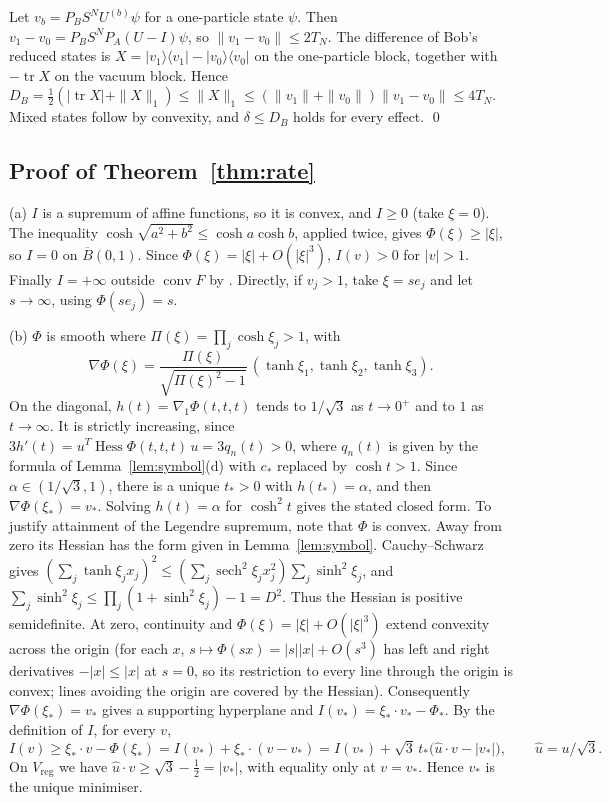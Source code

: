 \documentclass[11pt]{amsart}
\theoremstyle{definition}
\theoremstyle{remark}
\newcommand{\tr}{\operatorname{tr}}
\newcommand{\Hess}{\operatorname{Hess}}
\newcommand{\uhat}{\hat u}
\begin{document}
Let $v_b=P_BS^NU^{(b)}\psi$ for a one-particle state $\psi$.  Then
$v_1-v_0=P_BS^NP_A(U-I)\psi$, so $\|v_1-v_0\|\le2T_N$.  The difference of
Bob's reduced states is $X=|v_1\rangle\langle v_1|-|v_0\rangle\langle v_0|$ on
the one-particle block, together with $-\tr X$ on the vacuum block.  Hence
$D_B=\frac12(|\tr X|+\|X\|_1)\le\|X\|_1\le(\|v_1\|+\|v_0\|)\|v_1-v_0\|\le4T_N$.
Mixed states follow by convexity, and $\delta\le D_B$ holds for every effect.
\qed

\subsection{Proof of Theorem~\ref{thm:rate}}
(a) $I$ is a supremum of affine functions, so it is convex, and $I\ge0$
(take $\xi=0$).  The inequality
$\cosh\sqrt{a^2+b^2}\le\cosh a\cosh b$, applied twice, gives
$\Phi(\xi)\ge|\xi|$, so $I=0$ on $\overline B(0,1)$.  Since
$\Phi(\xi)=|\xi|+O(|\xi|^3)$, $I(v)>0$ for $|v|>1$.  Finally $I=+\infty$ outside
$\operatorname{conv}F$ by \cite[Lemma~4.1]{CJWW}.  Directly, if
$v_j>1$, take $\xi=se_j$ and let $s\to\infty$, using $\Phi(se_j)=s$.

(b) $\Phi$ is smooth where $\Pi(\xi)=\prod_j\cosh\xi_j>1$, with
\[
\nabla\Phi(\xi)=\frac{\Pi(\xi)}{\sqrt{\Pi(\xi)^2-1}}\,(\tanh\xi_1,\tanh\xi_2,\tanh\xi_3).
\]
On the diagonal, $h(t)=\nabla_1\Phi(t,t,t)$ tends to $1/\sqrt3$ as
$t\to0^+$ and to $1$ as $t\to\infty$.  It is strictly increasing, since
$3h'(t)=u^T\Hess\Phi(t,t,t)\,u=3q_n(t)>0$, where $q_n(t)$ is given by the
formula of Lemma~\ref{lem:symbol}(d) with $c_*$ replaced by $\cosh t>1$.  Since
$\alpha\in(1/\sqrt3,1)$, there is a unique $t_*>0$ with $h(t_*)=\alpha$, and
then $\nabla\Phi(\xi_*)=v_*$.  Solving $h(t)=\alpha$ for $\cosh^2t$ gives the
stated closed form. To justify attainment of the Legendre supremum, note
that $\Phi$ is convex. Away from zero its Hessian has the form given in
Lemma~\ref{lem:symbol}. Cauchy--Schwarz gives
$(\sum_j\tanh\xi_j x_j)^2\le
(\sum_j\operatorname{sech}^2\xi_j x_j^2)\sum_j\sinh^2\xi_j$,
and $\sum_j\sinh^2\xi_j\le\prod_j(1+\sinh^2\xi_j)-1=D^2$.
Thus the Hessian is positive semidefinite. At zero, continuity and
$\Phi(\xi)=|\xi|+O(|\xi|^3)$ extend convexity across the origin
(for each $x$, $s\mapsto\Phi(sx)=|s||x|+O(s^3)$ has left and right
derivatives $-|x|\le|x|$ at $s=0$, so its restriction to every line
through the origin is convex; lines avoiding the origin are covered by the
Hessian).
Consequently $\nabla\Phi(\xi_*)=v_*$ gives a supporting hyperplane and
$I(v_*)=\xi_*\cdot v_*-\Phi_*$. By the definition of $I$, for every $v$,
\[
I(v)\ge\xi_*\cdot v-\Phi(\xi_*)=I(v_*)+\xi_*\cdot(v-v_*)
=I(v_*)+\sqrt3\,t_*\bigl(\uhat\cdot v-|v_*|\bigr),
\qquad \uhat=u/\sqrt3 .
\]
On $V_{\mathrm{reg}}$ we have $\uhat\cdot v\ge\sqrt3-\frac12=|v_*|$, with
equality only at $v=v_*$.  Hence $v_*$ is the unique minimiser.
\end{document}
